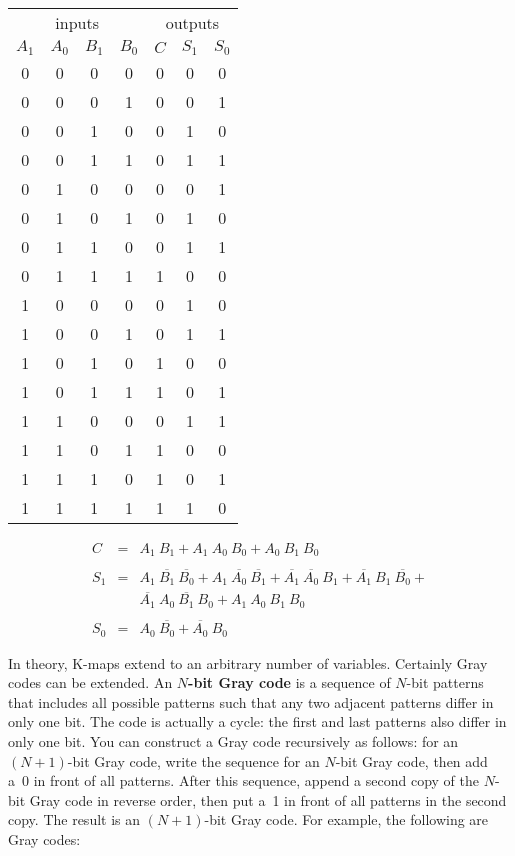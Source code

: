 \begin{minipage}{2.25in}
\begin{tabular}{cccc|ccc}
\multicolumn{4}{c|}{inputs}& \multicolumn{3}{c}{outputs}\\
$A_1$& $A_0$& $B_1$& $B_0$& $C$& $S_1$& $S_0$\\ \hline
0&0& 0&0& 0& 0&0\\
0&0& 0&1& 0& 0&1\\
0&0& 1&0& 0& 1&0\\
0&0& 1&1& 0& 1&1\\
0&1& 0&0& 0& 0&1\\
0&1& 0&1& 0& 1&0\\
0&1& 1&0& 0& 1&1\\
0&1& 1&1& 1& 0&0\\
1&0& 0&0& 0& 1&0\\
1&0& 0&1& 0& 1&1\\
1&0& 1&0& 1& 0&0\\
1&0& 1&1& 1& 0&1\\
1&1& 0&0& 0& 1&1\\
1&1& 0&1& 1& 0&0\\
1&1& 1&0& 1& 0&1\\
1&1& 1&1& 1& 1&0\\
\end{tabular}
\end{minipage}\hspace{0.34in}%
\begin{minipage}{3.91in}

\hspace{0.3in}\hspace{0.3in}

\begin{eqnarray*}
C&=&A_1~B_1+A_1~A_0~B_0+A_0~B_1~B_0\\
\\
S_1&=&
A_1~\overline{B_1}~\overline{B_0}+
A_1~\overline{A_0}~\overline{B_1}+
\overline{A_1}~\overline{A_0}~B_1+
\overline{A_1}~B_1~\overline{B_0}+\\
&&\overline{A_1}~A_0~\overline{B_1}~B_0+
A_1~A_0~B_1~B_0\\
\\
S_0&=&A_0~\overline{B_0}+\overline{A_0}~B_0
\end{eqnarray*}
\end{minipage}

In theory, \mbox{K-maps} extend to an arbitrary number of variables.
Certainly Gray codes can be extended.  An {\bf \mbox{$N$-bit} Gray code} 
is a sequence of \mbox{$N$-bit} patterns that includes all possible
patterns such that any two adjacent patterns differ in only one bit.
The code is actually a cycle: the first and last patterns also differ
in only one bit.  You can construct a Gray code recursively as follows:
for an \mbox{$(N+1)$-bit} Gray code, write the sequence for an
\mbox{$N$-bit} Gray code, then add a~0 in front of all patterns.
After this sequence, append a second copy of the \mbox{$N$-bit} Gray
code in reverse order, then put a~1 in front of all patterns in the
second copy.  The result is an \mbox{$(N+1)$-bit} Gray code.
For example, the following are Gray codes:

